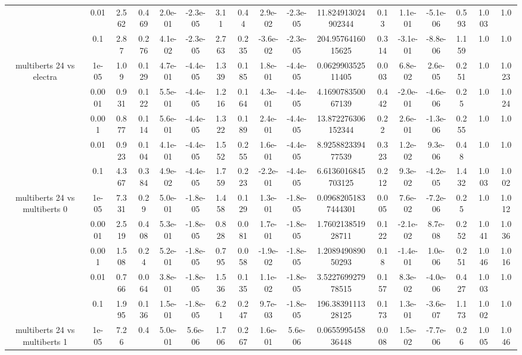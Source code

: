 \begin{tabular}{|c|c|c|c|c|c|c|c|c|c|c|c|c|c|c|c|c|}
 & 0.01 & 2.562 & 0.469 & 2.0e-01 & -2.3e-05 & 3.11 & 0.44 & 2.9e-02 & -2.3e-05 & 11.824913024902344 & 0.13 & 1.1e-01 & -5.1e-06 & 0.593 & 1.003 & 1.0 \\
 & 0.1 & 2.87 & 0.276 & 4.1e-02 & -2.3e-05 & 2.763 & 0.235 & -3.6e-02 & -2.3e-05 & 204.9576416015625 & 0.314 & -3.1e-01 & -8.8e-06 & 1.159 & 1.0 & 1.0 \\
\hline
\multirow{5}{*}{multiberts 24 vs electra } & 1e-05 & 1.09 & 0.129 & 4.7e-01 & -4.4e-05 & 1.339 & 0.185 & 1.8e-01 & -4.4e-05 & 0.062990352511405 & 0.003 & 6.8e-02 & 2.6e-05 & 0.251 & 1.0 & 1.023 \\
 & 0.0001 & 0.931 & 0.122 & 5.5e-01 & -4.4e-05 & 1.216 & 0.164 & 4.3e-01 & -4.4e-05 & 4.169078350067139 & 0.442 & -2.0e-01 & -4.6e-06 & 0.25 & 1.0 & 1.024 \\
 & 0.001 & 0.877 & 0.114 & 5.6e-01 & -4.4e-05 & 1.322 & 0.189 & 2.4e-01 & -4.4e-05 & 13.872276306152344 & 0.22 & 2.6e-01 & -1.3e-06 & 0.255 & 1.0 & 1.0 \\
 & 0.01 & 0.923 & 0.104 & 4.1e-01 & -4.4e-05 & 1.552 & 0.255 & 1.6e-01 & -4.4e-05 & 8.925882339477539 & 0.323 & 1.2e-02 & 9.3e-06 & 0.48 & 1.0 & 1.0 \\
 & 0.1 & 4.367 & 0.384 & 4.9e-02 & -4.4e-05 & 1.759 & 0.223 & -2.2e-01 & -4.4e-05 & 6.6136016845703125 & 0.212 & 9.3e-02 & -4.2e-05 & 1.432 & 1.003 & 1.002 \\
\hline
\multirow{5}{*}{multiberts 24 vs multiberts 0} & 1e-05 & 7.331 & 0.29 & 5.0e-01 & -1.8e-05 & 1.458 & 0.129 & 1.3e-01 & -1.8e-05 & 0.09682051837444301 & 0.005 & 7.6e-02 & -7.2e-06 & 0.25 & 1.0 & 1.012 \\
 & 0.0001 & 2.519 & 0.408 & 5.3e-01 & -1.8e-05 & 0.828 & 0.081 & 1.7e-01 & -1.8e-05 & 1.760213851928711 & 0.122 & -2.1e-02 & 8.7e-08 & 0.252 & 1.041 & 1.036 \\
 & 0.001 & 1.508 & 0.24 & 5.2e-01 & -1.8e-05 & 0.795 & 0.058 & -1.9e-02 & -1.8e-05 & 1.208949089050293 & 0.18 & -1.4e-01 & 1.0e-06 & 0.251 & 1.046 & 1.016 \\
 & 0.01 & 0.766 & 0.064 & 3.8e-01 & -1.8e-05 & 1.536 & 0.135 & 1.1e-02 & -1.8e-05 & 3.522769927978515 & 0.157 & 8.3e-02 & -4.0e-06 & 0.427 & 1.003 & 1.0 \\
 & 0.1 & 1.995 & 0.136 & 1.5e-01 & -1.8e-05 & 6.21 & 0.247 & 9.7e-03 & -1.8e-05 & 196.3839111328125 & 0.173 & 1.3e-01 & -3.6e-07 & 1.173 & 1.002 & 1.0 \\
\hline
\multirow{5}{*}{multiberts 24 vs multiberts 1} & 1e-05 & 7.26 & 0.4 & 5.0e-01 & 5.6e-06 & 1.706 & 0.267 & 1.6e-01 & 5.6e-06 & 0.065599545836448 & 0.008 & 1.5e-02 & -7.7e-06 & 0.26 & 1.005 & 1.046 \\

\end{tabular}
